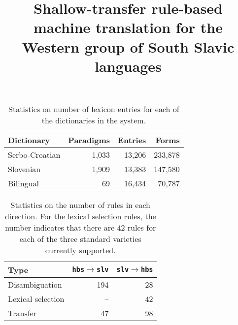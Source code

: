 \documentclass[10pt, a4paper]{article}
\title{Shallow-transfer rule-based machine translation for the Western group of South Slavic languages}
\begin{document}
\maketitleabstract














\begin{table}

\begin{center}
\begin{tabular}{|l|rrr|}
\hline
\textbf{Dictionary} & \textbf{Paradigms} & \textbf{Entries} & \textbf{Forms} \\
\hline
Serbo-Croatian &  1,033 & 13,206 & 233,878 \\
Slovenian &  1,909 & 13,383 & 147,580 \\
\hline
Bilingual &  69 &  16,434 & 70,787 \\
\hline
\end{tabular}
\caption{Statistics on number of lexicon entries for each of the dictionaries in the 
   system.}
\end{center}

\end{table}

\begin{table}
\begin{center}
\begin{tabular}{|l|rr|}
\hline
 \textbf{Type}      & \texttt{hbs}$\rightarrow$\texttt{slv} & \texttt{slv}$\rightarrow$\texttt{hbs}\\
\hline
Disambiguation      &     194              &     28 \\
Lexical selection   &     --            &  42 \\
Transfer            &                47 &  98 \\
\hline

\end{tabular}
 \caption{Statistics on the number of rules in each direction. For the lexical selection rules, 
   the number indicates that there are 42 rules for each of the three standard varieties currently
   supported.}
\end{center}
\end{table}


\end{document}
